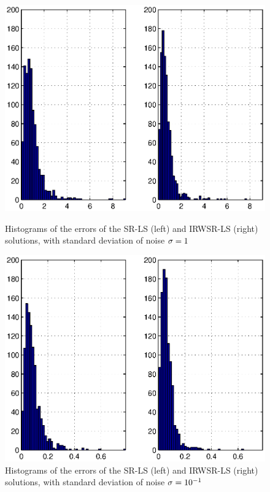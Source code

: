 \begin{figure}
\centering
\includegraphics[width=1\textwidth,height=0.4\textheight]{figures/range_dif_IRWLS/Noise00LeftBeckRightRD}%
\caption{Histograms of the errors of the SR-LS (left) and IRWSR-LS (right) solutions, with standard deviation of noise $\protect\sigma = 1$}
\label{fig:Noise00IRDW}
\centering
\includegraphics[width=1\textwidth,height=0.4\textheight]{figures/range_dif_IRWLS/Noise01LeftBeckRightRD}%
\caption{Histograms of the errors of the SR-LS (left) and IRWSR-LS (right) solutions, with standard deviation of noise  $\protect\sigma = 10^{-1}$}
\label{fig:Noise01IRDW}
\end{figure}

